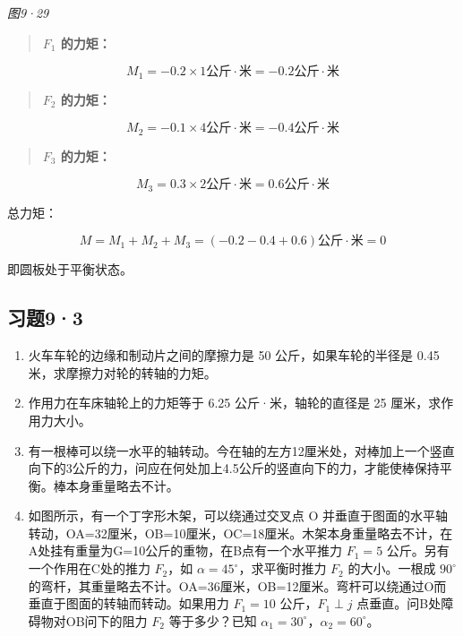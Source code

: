 \emph{图9·29}

\begin{quote}
\textbf{\(F_{1}\) 的力矩：}
\end{quote}

\[
M _ {1} = - 0.2 \times 1 \text{公斤}\mathbin{\cdot}\text{米} = - 0.2 \text{公斤}\mathbin{\cdot}\text{米}
\]

\begin{quote}
\textbf{\(F_{2}\) 的力矩：}
\end{quote}

\[
M _ {2} = - 0.1 \times 4 \text{公斤}\mathbin{\cdot}\text{米} = - 0.4 \text{公斤}\mathbin{\cdot}\text{米}
\]

\begin{quote}
\textbf{\(F_{3}\) 的力矩：}
\end{quote}

\[
M _ {3} = 0.3 \times 2 \text{公斤}\mathbin{\cdot}\text{米} = 0.6 \text{公斤}\mathbin{\cdot}\text{米}
\]

总力矩：

\[
M = M _ {1} + M _ {2} + M _ {3} = (- 0.2 - 0.4 + 0.6) \text{公斤}\mathbin{\cdot}\text{米} = 0
\]

即圆板处于平衡状态。

\subsection{习题9·3}\label{ux4e60ux989893}

\begin{enumerate}
\def\labelenumi{\arabic{enumi}.}
\item
  火车车轮的边缘和制动片之间的摩擦力是 50 公斤，如果车轮的半径是 0.45
  米，求摩擦力对轮的转轴的力矩。
\item
  作用力在车床轴轮上的力矩等于 6.25 公斤·米，轴轮的直径是 25
  厘米，求作用力大小。
\item
  有一根棒可以绕一水平的轴转动。今在轴的左方12厘米处，对棒加上一个竖直向下的3公斤的力，问应在何处加上4.5公斤的竖直向下的力，才能使棒保持平衡。棒本身重量略去不计。
\item
  如图所示，有一个丁字形木架，可以绕通过交叉点 O
  并垂直于图面的水平轴转动，OA=32厘米，OB=10厘米，OC=18厘米。木架本身重量略去不计，在A处挂有重量为G=10公斤的重物，在B点有一个水平推力
  \(F_{1}=5\) 公斤。另有一个作用在C处的推力 \(F_{2}\)，如
  \(\alpha=45^{\circ}\)，求平衡时推力 \(F_{2}\) 的大小。一根成
  \(90^{\circ}\)
  的弯杆，其重量略去不计。OA=36厘米，OB=12厘米。弯杆可以绕通过O而垂直于图面的转轴而转动。如果用力
  \(F_{1}=10\) 公斤，\(F_{1}\perp j\) 点垂直。问B处障碍物对OB问下的阻力
  \(F_{2}\) 等于多少？已知
  \(\alpha_{1}=30^{\circ}\)，\(\alpha_{2}=60^{\circ}\)。
\end{enumerate}

